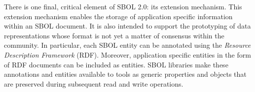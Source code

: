There is one final, critical element of SBOL 2.0: its extension mechanism.  This extension mechanism enables the storage of application specific information within an SBOL document.  It is also intended to support the prototyping of data representations whose format is not yet a matter of consensus within the community.  In particular, each SBOL entity can be annotated using the \emph{Resource Description Framework} (RDF). Moreover, application specific entities in the form of RDF documents can be included as  entities. SBOL libraries make these annotations and entities available to tools as generic properties and objects that are preserved during subsequent read and write operations.

